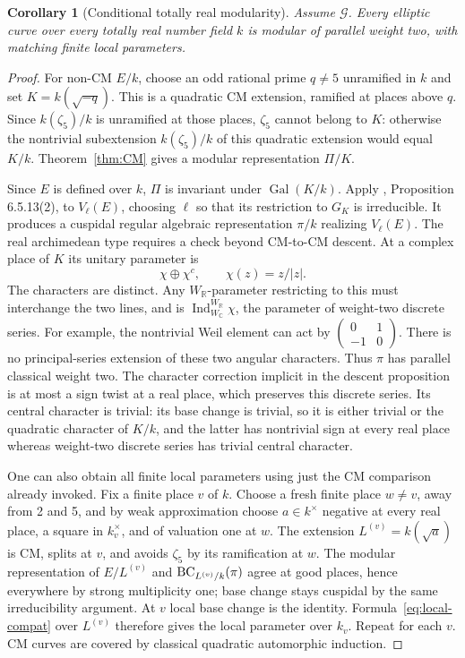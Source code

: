 \documentclass[11pt,a4paper]{article}
\newtheorem{corollary}[theorem]{Corollary}
\theoremstyle{definition}\newtheorem{definition}[theorem]{Definition}
\theoremstyle{remark}\newtheorem*{remark}{Remark}
\newcommand{\C}{\mathbb C}\newcommand{\A}{\mathbb A}
\newcommand{\Gal}{\operatorname{Gal}}\newcommand{\Res}{\operatorname{Res}}
\newcommand{\Ginput}{\mathcal G}
\begin{document}
\begin{corollary}[Conditional totally real modularity]\label{cor:TR}
Assume \(\Ginput\). Every elliptic curve over every totally real number
field \(k\) is modular of parallel weight two, with matching finite local
parameters.
\end{corollary}
\begin{proof}
For non-CM \(E/k\), choose an odd rational prime \(q\ne5\) unramified in \(k\)
and set \(K=k(\sqrt{-q})\). This is a quadratic CM extension, ramified at
places above \(q\). Since \(k(\zeta_5)/k\) is unramified at those places,
\(\zeta_5\) cannot belong to \(K\): otherwise the nontrivial subextension
\(k(\zeta_5)/k\) of this quadratic extension would equal \(K/k\).
Theorem~\ref{thm:CM} gives a modular representation \(\Pi/K\).

Since \(E\) is defined over \(k\), \(\Pi\) is invariant under \(\Gal(K/k)\).
Apply \cite{ACC}, Proposition 6.5.13(2), to \(V_\ell(E)\), choosing \(\ell\)
so that its restriction to \(G_K\) is irreducible. It produces a cuspidal
regular algebraic representation \(\pi/k\) realizing \(V_\ell(E)\).
The real archimedean type requires a check beyond CM-to-CM descent.
At a complex place of \(K\) its unitary parameter is
\[
 \chi\oplus\chi^c,\qquad \chi(z)=z/|z|.
\]
The characters are distinct. Any \(W_\mathbb R\)-parameter restricting to
this must interchange the two lines, and is
\(\operatorname{Ind}_{W_\C}^{W_\mathbb R}\chi\), the parameter of
weight-two discrete series. For example, the nontrivial Weil element can
act by \(\left(\begin{smallmatrix}0&1\\-1&0\end{smallmatrix}\right)\).
There is no principal-series extension of these two angular characters.
Thus $\pi$ has parallel classical weight two. The character correction
implicit in the descent proposition is at most a sign twist at a real place,
which preserves this discrete series. Its central character is trivial:
its base change is trivial, so it is either trivial or the quadratic character
of $K/k$, and the latter has nontrivial sign at every real place whereas
weight-two discrete series has trivial central character.

One can also obtain all finite local parameters using just the CM comparison
already invoked. Fix a finite place \(v\) of \(k\). Choose a fresh finite place
\(w\ne v\), away from 2 and 5, and by weak approximation choose \(a\in k^\times\)
negative at every real place, a square in \(k_v^\times\), and of valuation one
at \(w\). The extension \(L^{(v)}=k(\sqrt a)\) is CM, splits at \(v\), and avoids
\(\zeta_5\) by its ramification at \(w\).
The modular representation of \(E/L^{(v)}\) and \(\operatorname{BC}_{L^{(v)}/k}(\pi)\) agree at
good places, hence everywhere by strong multiplicity one; base change stays
cuspidal by the same irreducibility argument. At \(v\) local base change is
the identity. Formula~\eqref{eq:local-compat} over \(L^{(v)}\) therefore gives the local parameter
over \(k_v\). Repeat for each \(v\). CM curves are covered by classical
quadratic automorphic induction.
\end{proof}
\end{document}

